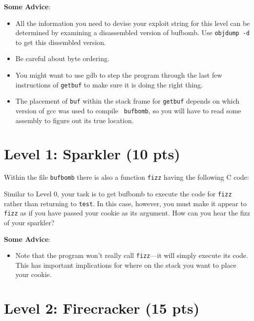 \documentclass[11pt]{article}
\newenvironment{ccode}%
{\small}%
{}
\begin{document}
{\bf Some Advice}:
\begin{itemize}

\item All the information you need to devise your exploit string for
this level can be determined by examining a disassembled version of
{\sc bufbomb}. Use {\tt objdump -d} to get this dissembled version.

\item
Be careful about byte ordering.  

\item
You might want to use {\sc gdb} to step the program through the last
few instructions of {\tt getbuf} to make sure it is doing the right
thing.

\item
The placement of {\tt buf} within the stack frame for {\tt getbuf}
depends on which version of {\sc gcc} was used to compile {\tt
bufbomb}, so you will have to read some assembly to figure out its
true location. 
\end{itemize}


\section*{Level 1: Sparkler (10 pts)}

Within the file {\tt bufbomb} there is also a function {\tt fizz}
having the following C code:

\begin{ccode}

\end{ccode}

Similar to Level 0, your task is to get {\sc bufbomb} to execute the
code for {\tt fizz} rather than returning to {\tt test}.  In this
case, however, you must make it appear to {\tt fizz} as if you have
passed your cookie as its argument. How can you hear the fizz of your sparkler?


{\bf Some Advice}:
\begin{itemize}

\item Note that the program won't really call {\tt fizz}---it will
simply execute its code. This has important implications for where on
the stack you want to place your cookie.

\end{itemize}

\section*{Level 2: Firecracker (15 pts)}
\end{document}
